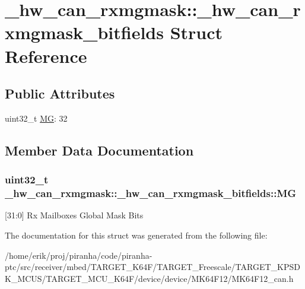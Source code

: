 \hypertarget{struct__hw__can__rxmgmask_1_1__hw__can__rxmgmask__bitfields}{}\section{\+\_\+hw\+\_\+can\+\_\+rxmgmask\+:\+:\+\_\+hw\+\_\+can\+\_\+rxmgmask\+\_\+bitfields Struct Reference}
\label{struct__hw__can__rxmgmask_1_1__hw__can__rxmgmask__bitfields}
\subsection*{Public Attributes}
\begin{DoxyCompactItemize}
\item 
uint32\+\_\+t \hyperlink{struct__hw__can__rxmgmask_1_1__hw__can__rxmgmask__bitfields_a5c7708baf45947e0d7b71840f9cd4bff}{MG}\+: 32
\end{DoxyCompactItemize}


\subsection{Member Data Documentation}
\subsubsection[{\texorpdfstring{MG}{MG}}]{\setlength{\rightskip}{0pt plus 5cm}uint32\+\_\+t \+\_\+hw\+\_\+can\+\_\+rxmgmask\+::\+\_\+hw\+\_\+can\+\_\+rxmgmask\+\_\+bitfields\+::\+MG}\hypertarget{struct__hw__can__rxmgmask_1_1__hw__can__rxmgmask__bitfields_a5c7708baf45947e0d7b71840f9cd4bff}{}\label{struct__hw__can__rxmgmask_1_1__hw__can__rxmgmask__bitfields_a5c7708baf45947e0d7b71840f9cd4bff}
\mbox{[}31\+:0\mbox{]} Rx Mailboxes Global Mask Bits 

The documentation for this struct was generated from the following file\+:\begin{DoxyCompactItemize}
\item 
/home/erik/proj/piranha/code/piranha-\/ptc/src/receiver/mbed/\+T\+A\+R\+G\+E\+T\+\_\+\+K64\+F/\+T\+A\+R\+G\+E\+T\+\_\+\+Freescale/\+T\+A\+R\+G\+E\+T\+\_\+\+K\+P\+S\+D\+K\+\_\+\+M\+C\+U\+S/\+T\+A\+R\+G\+E\+T\+\_\+\+M\+C\+U\+\_\+\+K64\+F/device/device/\+M\+K64\+F12/M\+K64\+F12\+\_\+can.\+h\end{DoxyCompactItemize}
